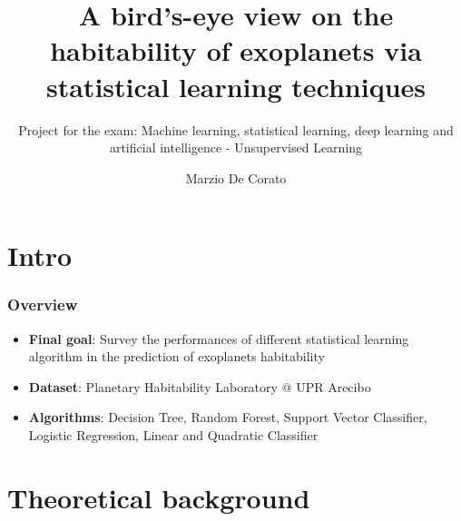 \documentclass[compress]{beamer}
\author{Marzio De Corato}
\title[Exoplanets survey via SL techniques]{A bird’s-eye view on the habitability of exoplanets via statistical learning techniques}
\author{}
\date{}
\subtitle{Project for the exam: Machine learning, statistical
learning, deep learning and artificial intelligence - Unsupervised Learning}
\begin{document}
\frame{\vspace{+4.5cm}\titlepage}

\usebackgroundtemplate{ } 

\section{Intro}

\begin{frame}
\frametitle{Overview}
\begin{itemize}
\item\textbf{Final goal}: Survey the performances of different statistical learning algorithm in the prediction of exoplanets habitability
\item\textbf{Dataset}: Planetary Habitability Laboratory @ UPR Arecibo \cite{planet_dataset}
\item\textbf{Algorithms}: Decision Tree, Random Forest, Support Vector Classifier, Logistic Regression, Linear and Quadratic Classifier
\end{itemize}
\end{frame}

\section{Theoretical background}
\end{document}
